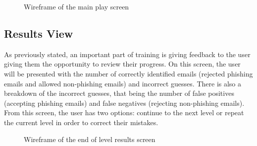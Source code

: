 \documentclass{l4proj}
\begin{document}
\begin{figure}[H]
    \centering
    \caption{Wireframe of the main play screen}
    \label{fig:main_wf} 
\end{figure}

\subsection{Results View}
As previously stated, an important part of training is giving feedback to the user giving them the opportunity to review their progress. On this screen, the user will be presented with the number of correctly identified emails (rejected phishing emails and allowed non-phishing emails) and incorrect guesses. There is also a breakdown of the incorrect guesses, that being the number of false positives (accepting phishing emails) and false negatives (rejecting non-phishing emails). From this screen, the user has two options: continue to the next level or repeat the current level in order to correct their mistakes. 

\begin{figure}[H]
    \centering
    \caption{Wireframe of the end of level results screen}
    \label{fig:results_wf} 
\end{figure}
\end{document}
